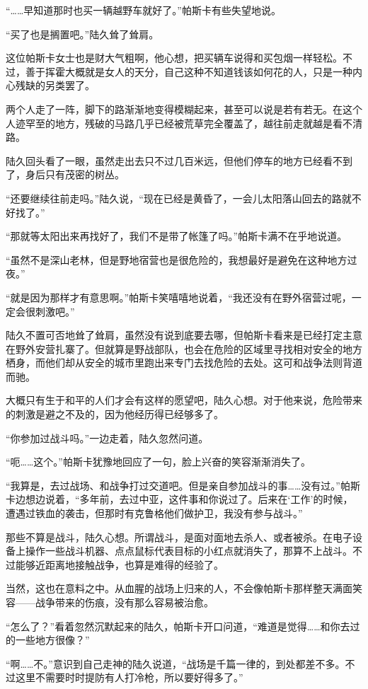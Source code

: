 “……早知道那时也买一辆越野车就好了。”帕斯卡有些失望地说。

“买了也是搁置吧。”陆久耸了耸肩。

这位帕斯卡女士也是财大气粗啊，他心想，把买辆车说得和买包烟一样轻松。不过，善于挥霍大概就是女人的天分，自己这种不知道钱该如何花的人，只是一种内心残缺的另类罢了。

两个人走了一阵，脚下的路渐渐地变得模糊起来，甚至可以说是若有若无。在这个人迹罕至的地方，残破的马路几乎已经被荒草完全覆盖了，越往前走就越是看不清路。

陆久回头看了一眼，虽然走出去只不过几百米远，但他们停车的地方已经看不到了，身后只有茂密的树丛。

“还要继续往前走吗。”陆久说，“现在已经是黄昏了，一会儿太阳落山回去的路就不好找了。”

“那就等太阳出来再找好了，我们不是带了帐篷了吗。”帕斯卡满不在乎地说道。

“虽然不是深山老林，但是野地宿营也是很危险的，我想最好是避免在这种地方过夜。”

“就是因为那样才有意思啊。”帕斯卡笑嘻嘻地说着，“我还没有在野外宿营过呢，一定会很刺激吧。”

陆久不置可否地耸了耸肩，虽然没有说到底要去哪，但帕斯卡看来是已经打定主意在野外安营扎寨了。但就算是野战部队，也会在危险的区域里寻找相对安全的地方栖身，而他们却从安全的城市里跑出来专门去找危险的去处。这可和战争法则背道而驰。

大概只有生于和平的人们才会有这样的愿望吧，陆久心想。对于他来说，危险带来的刺激是避之不及的，因为他经历得已经够多了。

“你参加过战斗吗。”一边走着，陆久忽然问道。

“呃……这个。”帕斯卡犹豫地回应了一句，脸上兴奋的笑容渐渐消失了。

“我算是，去过战场、和战争打过交道吧。但是亲自参加战斗的事……没有过。”帕斯卡边想边说着，“多年前，去过中亚，这件事和你说过了。后来在‘工作’的时候，遭遇过铁血的袭击，但那时有克鲁格他们做护卫，我没有参与战斗。”

那些不算是战斗，陆久心想。所谓战斗，是面对面地去杀人、或者被杀。在电子设备上操作一些战斗机器、点点鼠标代表目标的小红点就消失了，那算不上战斗。不过能够近距离地接触战争，也算是难得的经验了。

当然，这也在意料之中。从血腥的战场上归来的人，不会像帕斯卡那样整天满面笑容——战争带来的伤痕，没有那么容易被治愈。

“怎么了？”看着忽然沉默起来的陆久，帕斯卡开口问道，“难道是觉得……和你去过的一些地方很像？”

“啊……不。”意识到自己走神的陆久说道，“战场是千篇一律的，到处都差不多。不过这里不需要时时提防有人打冷枪，所以要好得多了。”

